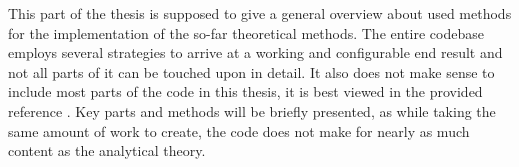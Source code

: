 This part of the thesis is supposed to give a general overview about used methods for the implementation of the so-far theoretical methods.
The entire codebase employs several strategies to arrive at a working and configurable end result and not all parts of it can be touched upon in detail.
It also does not make sense to include most parts of the code in this thesis, it is best viewed in the provided reference \cite{selfCode}.
Key parts and methods will be briefly presented, as while taking the same amount of work to create, the code does not make for nearly as much content as the analytical theory.